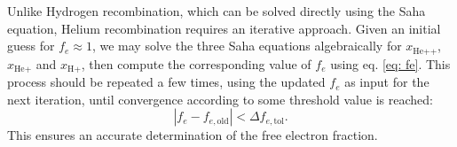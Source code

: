 \documentclass{aa}
\numberwithin{equation}{section}
\numberwithin{table}{section}
\numberwithin{figure}{section}
\begin{document}


Unlike Hydrogen recombination, which can be solved directly using the Saha equation, Helium recombination requires an iterative approach. Given an initial guess for $ f_e \approx 1 $, we may solve the three Saha equations algebraically for $x_{\text{He++}}$, $x_{\text{He+}}$ and $x_{\text{H+}}$, then compute the corresponding value of $f_e$ using eq. \eqref{eq: fe}. This process should be repeated a few times, using the updated $f_e$ as input for the next iteration, until convergence according to some threshold value is reached:
\begin{equation}
  |f_e - f_{e,\text{old}} | < \Delta f_{e,\text{tol}}.
\end{equation}
This ensures an accurate determination of the free electron fraction.

\end{document}
